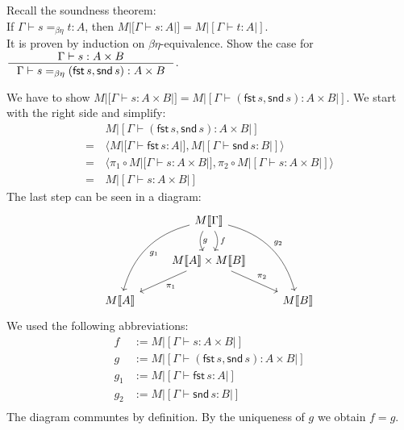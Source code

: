 \begin{exercise}
    Recall the soundness theorem:\\
    If $\Gamma \vdash s =_{\beta\eta} t : A$, then $M |[ \Gamma \vdash s: A |] = M |[ \Gamma \vdash t: A |]$.\\
    It is proven by induction on $\beta\eta$-equivalence.
    Show the case for $\inference{\Gamma \vdash s: A \times B}{\Gamma \vdash s =_{\beta\eta} (\mathsf{fst}\,s, \mathsf{snd}\,s): A \times B}$.
\end{exercise}
\begin{answer}
    We have to show $M |[ \Gamma \vdash s: A \times B |] = M |[ \Gamma \vdash (\mathsf{fst}\,s, \mathsf{snd}\,s): A \times B |]$.
    We start with the right side and simplify:
    \begin{align*}
          & M|[\Gamma \vdash (\mathsf{fst}\,s, \mathsf{snd}\,s): A \times B |]\\
        = \,& \langle M|[ \Gamma \vdash \mathsf{fst}\,s: A|], M|[\Gamma \vdash \mathsf{snd}\,s: B|]\rangle \\
        = \,& \langle \pi_1 \circ M|[ \Gamma \vdash s: A \times B |], \pi_2 \circ M|[\Gamma \vdash s: A \times B|]\rangle \\
        = \,& M|[ \Gamma \vdash s: A \times B |]
    \end{align*}
    The last step can be seen in a diagram:
    \[
        \begin{tikzcd}
            & M \llbracket \Gamma \rrbracket \arrow[bend left]{d}{f} \arrow[bend right]{d}{g} \arrow[bend right]{ddl}{g_1} \arrow[bend left]{ddr}{g_2} &\\
            & M \llbracket A \rrbracket \times M \llbracket B \rrbracket \arrow{dl}{\pi_1} \arrow{dr}{\pi_2} &\\
            M \llbracket A \rrbracket & & M \llbracket B \rrbracket
        \end{tikzcd}
    \]
    We used the following abbreviations:
    \begin{align*}
        f & := M |[\Gamma \vdash s : A \times B|] \\
        g & := M |[\Gamma \vdash (\mathsf{fst}\,s, \mathsf{snd}\,s) : A \times B|] \\
        g_1 & := M |[\Gamma \vdash \mathsf{fst}\,s : A|] \\
        g_2 & := M |[\Gamma \vdash \mathsf{snd}\,s : B|] \\
    \end{align*}
    The diagram communtes by definition.
    By the uniqueness of $g$ we obtain $f = g$.
\end{answer}

